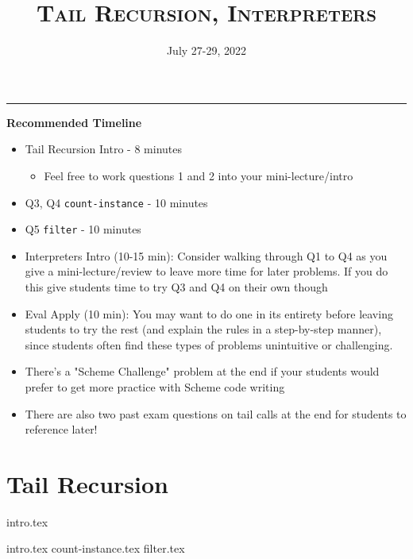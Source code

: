 \documentclass{exam}
\title{\textsc{Tail Recursion, Interpreters}}
\date{July 27-29, 2022}
\begin{document}
\maketitle
\rule{\textwidth}{0.15em}
\fontsize{12}{15}\selectfont

\begin{guide}
\begin{blocksection}
    \textbf{Recommended Timeline}
    \begin{itemize}
        \item Tail Recursion Intro - 8 minutes
        \begin{itemize}
            \item Feel free to work questions 1 and 2 into your mini-lecture/intro
        \end{itemize}
        \item Q3, Q4 \lstinline{count-instance} - 10 minutes
        \item Q5 \lstinline{filter} - 10 minutes
        \item Interpreters Intro (10-15 min): Consider walking through Q1 to Q4 as 
        you give a mini-lecture/review to leave more time for later problems. If you do this give students time to try 
        Q3 and Q4 on their own though
        \item Eval Apply (10 min): You may want to do one in its entirety before leaving students to try the rest
        (and explain the rules in a step-by-step manner), since students often find these types of problems unintuitive or challenging.
        \item There's a "Scheme Challenge" problem at the end if your students would prefer to get more practice with Scheme code writing
        \item There are also two past exam questions on tail calls at the end for students to reference later!
    \end{itemize}
\end{blocksection}
\newpage
\end{guide}

\section{Tail Recursion}
{intro.tex}
\begin{questions}
{intro.tex}
\newpage
{count-instance.tex}
{filter.tex}
\end{questions}
\end{document}

